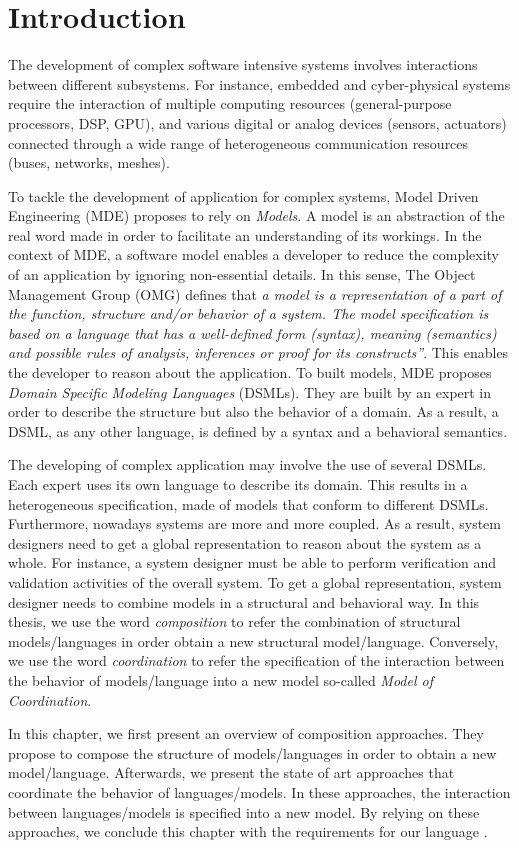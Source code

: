 \section{Introduction}
The development of complex software intensive systems involves interactions between different subsystems. For instance, embedded and cyber-physical systems require the interaction of multiple computing resources (general-purpose processors, DSP, GPU), and various digital or analog devices (sensors, actuators) connected through a wide range of heterogeneous communication resources (buses, networks, meshes).

To tackle the development of application for complex systems, Model Driven Engineering (MDE) proposes to rely on \emph{Models}. A model is an abstraction of the real word made in order to facilitate an understanding of its workings. In the context of MDE, a software model enables a developer to reduce the complexity of an application by ignoring non-essential details. In this sense, The Object Management Group (OMG) defines that \emph{a model is a representation of a part of the function, structure and/or behavior of a system. The model specification is based on a language that has a well-defined form (syntax), meaning (semantics) and possible rules of analysis, inferences or proof for its constructs”}. This enables the developer to reason about the application. To built models, MDE proposes \emph{Domain Specific Modeling Languages} (DSMLs). They are built by an expert in order to describe the structure but also the behavior of a domain. As a result, a DSML, as any other language, is defined by a syntax and a behavioral semantics. 

The developing of complex application may involve the use of several DSMLs. Each expert uses its own language to describe its domain. This results in a heterogeneous specification, \ie made of models that conform to different DSMLs. Furthermore, nowadays systems are more and more coupled. As a result, system designers need to get a global representation to reason about the system as a whole. For instance, a system designer must be able to perform verification and validation activities of the overall system. To get a global representation, system designer needs to combine models in a structural and behavioral way. In this thesis, we use the word \emph{composition} to refer the combination of structural models/languages in order obtain a new structural model/language. Conversely, we use the word \emph{coordination} to refer the specification of the interaction between the behavior of models/language into a new model so-called \emph{Model of Coordination}.   
 
In this chapter, we first present an overview of composition approaches. They propose to compose the structure of models/languages in order to obtain a new model/language. Afterwards, we present the state of art approaches that coordinate the behavior of languages/models. In these approaches, the interaction between languages/models is specified into a new model. By relying on these approaches, we conclude this chapter with the requirements for our language \bcool.        
